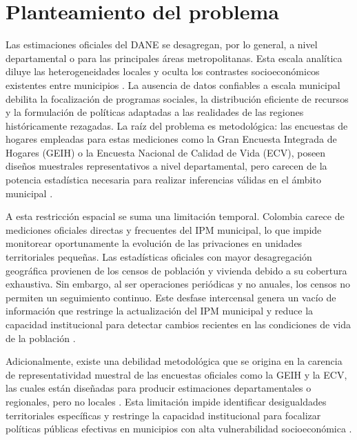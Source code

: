 
\label{sec:problema}


\section{Planteamiento del problema}

Las estimaciones oficiales del DANE se desagregan, por lo general, a nivel departamental o para las principales áreas metropolitanas. Esta escala analítica diluye las heterogeneidades locales y oculta los contrastes socioeconómicos existentes entre municipios \cite{DANE_PobrezaMultidimensional_2023}. La ausencia de datos confiables a escala municipal debilita la focalización de programas sociales, la distribución eficiente de recursos y la formulación de políticas adaptadas a las realidades de las regiones históricamente rezagadas. La raíz del problema es metodológica: las encuestas de hogares empleadas para estas mediciones como la Gran Encuesta Integrada de Hogares (GEIH) o la Encuesta Nacional de Calidad de Vida (ECV), poseen diseños muestrales representativos a nivel departamental, pero carecen de la potencia estadística necesaria para realizar inferencias válidas en el ámbito municipal \cite{DANE_ENCV_2022}.

A esta restricción espacial se suma una limitación temporal. Colombia carece de mediciones oficiales directas y frecuentes del IPM municipal, lo que impide monitorear oportunamente la evolución de las privaciones en unidades territoriales pequeñas. Las estadísticas oficiales con mayor desagregación geográfica provienen de los censos de población y vivienda debido a su cobertura exhaustiva. Sin embargo, al ser operaciones periódicas y no anuales, los censos no permiten un seguimiento continuo. Este desfase intercensal genera un vacío de información que restringe la actualización del IPM municipal y reduce la capacidad institucional para detectar cambios recientes en las condiciones de vida de la población \cite{DANE_PobrezaMultidimensional_2023, DANE_ENCV_2022}.

Adicionalmente, existe una debilidad metodológica que se origina en la carencia de representatividad muestral de las encuestas oficiales como la GEIH y la ECV, las cuales están diseñadas para producir estimaciones departamentales o regionales, pero no locales \cite{DANE_ENCV_2022}. Esta limitación impide identificar desigualdades territoriales específicas y restringe la capacidad institucional para focalizar políticas públicas efectivas en municipios con alta vulnerabilidad socioeconómica \cite{CEPAL_PanoramaSocial_2023}.

